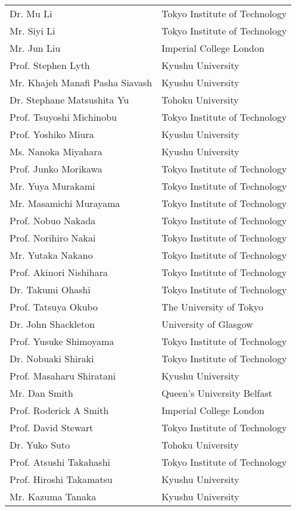 \begin{longtable}{ll}
Dr. Mu Li & Tokyo Institute of Technology \\
Mr. Siyi Li & Tokyo Institute of Technology \\
Mr. Jun Liu & Imperial College London \\
Prof. Stephen Lyth & Kyushu University \\
Mr. Khajeh Manafi Pasha Siavash	& Kyushu University \\
Dr. Stephane Matsushita Yu & Tohoku University \\
Prof. Tsuyoshi Michinobu & Tokyo Institute of Technology \\
Prof. Yoshiko Miura & Kyushu University \\
Ms. Nanoka Miyahara & Kyushu University \\
Prof. Junko Morikawa & Tokyo Institute of Technology \\
Mr. Yuya Murakami & Tokyo Institute of Technology \\
Mr. Masamichi Murayama & Tokyo Institute of Technology \\
Prof. Nobuo Nakada & Tokyo Institute of Technology \\
Prof. Norihiro Nakai & Tokyo Institute of Technology \\
Mr. Yutaka Nakano & Tokyo Institute of Technology \\
Prof. Akinori Nishihara & Tokyo Institute of Technology \\
Dr. Takumi Ohashi & Tokyo Institute of Technology \\
Prof. Tatsuya Okubo & The University of Tokyo \\
Dr. John Shackleton & University of Glasgow \\
Prof. Yusuke Shimoyama & Tokyo Institute of Technology \\
Dr. Nobuaki Shiraki & Tokyo Institute of Technology \\
Prof. Masaharu Shiratani & Kyushu University \\
Mr. Dan Smith & Queen's University Belfast \\
Prof. Roderick A Smith & Imperial College London \\
Prof. David Stewart & Tokyo Institute of Technology \\
Dr. Yuko Suto & Tohoku University \\
Prof. Atsushi Takahashi & Tokyo Institute of Technology \\
Prof. Hiroshi Takamatsu & Kyushu University \\
Mr. Kazuma Tanaka & Kyushu University \\

\end{longtable}
